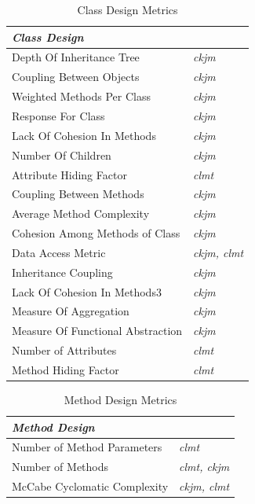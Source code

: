 \documentclass{sig-alternate}
\begin{document}
\begin{table}
\centering
\caption{Class Design Metrics}
\label{tbl:class-selected-metrics}
\begin{tabular}{l l}
 \hline
\multicolumn{2}{l}{\textit{\textbf{Class Design}}}\\
\hline
Depth Of Inheritance Tree & \textit{ckjm}\\
Coupling Between Objects & \textit{ckjm}\\
Weighted Methods Per Class & \textit{ckjm}\\
Response For Class & \textit{ckjm}\\
Lack Of Cohesion In Methods & \textit{ckjm}\\
Number Of Children & \textit{ckjm}\\
Attribute Hiding Factor & \textit{clmt}\\
Coupling Between Methods & \textit{ckjm}\\
Average Method Complexity & \textit{ckjm}\\
Cohesion Among Methods of Class & \textit{ckjm}\\
Data Access Metric & \textit{ckjm, clmt}\\
Inheritance Coupling & \textit{ckjm}\\
Lack Of Cohesion In Methods3 & \textit{ckjm}\\
Measure Of Aggregation & \textit{ckjm}\\
Measure Of Functional Abstraction & \textit{ckjm}\\
Number of Attributes & \textit{clmt}\\
Method Hiding Factor & \textit{clmt}\\
\hline
\end{tabular}
\end{table}

\begin{table}
\centering
\caption{Method Design Metrics}
\label{tbl:method-selected-metrics}
\begin{tabular}{l l}
 \hline
\multicolumn{2}{l}{\textit{\textbf{Method Design}}}\\
\hline
Number of Method Parameters & \textit{clmt}\\
Number of Methods & \textit{clmt, ckjm}\\
McCabe Cyclomatic Complexity & \textit{ckjm, clmt}\\
\hline
\end{tabular}
\end{table}
\end{document}
